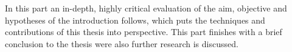 \chapter*{}
\label{ch:discussion}

In this part an in-depth, highly critical evaluation of the aim, objective and hypotheses of the introduction follows, which puts the techniques and contributions of this thesis into perspective. This part finishes with a brief conclusion to the thesis were also further research is discussed.



